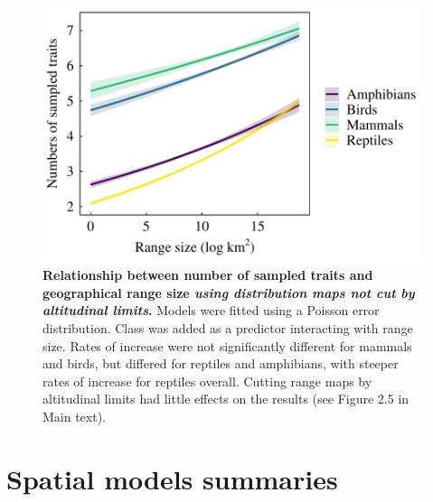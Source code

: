 \begin{figure}[h!]
\centering
\includegraphics[scale=0.7]{Supporting/Chapter2/Figures/Plot_BeforeCuttingRS}
\caption[ Relationship between number of sampled traits and geographical range size using distribution maps not cut by altitudinal limits]{\textbf{Relationship between number of sampled traits and geographical range size \textit{using distribution maps not cut by altitudinal limits}.} Models were fitted using a Poisson error distribution. Class was added as a predictor interacting with range size. Rates of increase were not significantly different for mammals and birds, but differed for reptiles and amphibians, with steeper rates of increase for reptiles overall. Cutting range maps by altitudinal limits had little effects on the results (see Figure 2.5 in Main text).} 
\label{SI2_plot_RS_notcut}
\end{figure}


\newpage
\pagebreak
\clearpage



\section{Spatial models summaries}

